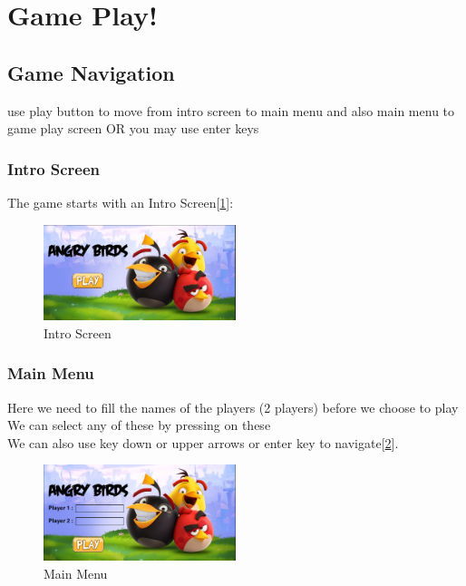 \documentclass[10pt]{article}
\begin{document}
    \section{Game Play!}
    \subsection{Game Navigation }
    use play button to move from intro screen to main menu and also main menu to game play screen OR you may use enter keys

    \subsubsection{Intro Screen}
    The game starts with an Intro Screen[\ref{fig:Intro}]:
    \begin{figure}[h!]
        \centering
        \includegraphics[width=0.5\textwidth]{Intro}
        \caption{Intro Screen}\label{fig:Intro}
    \end{figure}

    \subsubsection{Main Menu}
    Here we need to fill the names of the players (2 players) before we choose to play \\
    We can select any of these by pressing on these\\
    We can also use key down or upper arrows or enter key to
    navigate[\ref{fig:MainMenu}].
    \begin{figure}[h!]
        \centering
        \includegraphics[width=0.5\textwidth]{MainMenu}
        \caption{Main Menu}\label{fig:MainMenu}
    \end{figure}
    \newpage
\end{document}
